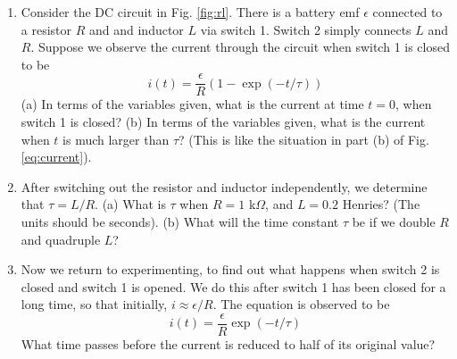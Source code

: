 \documentclass{article}
\begin{document}
\begin{enumerate}
\item Consider the DC circuit in Fig. \ref{fig:rl}.  There is a battery emf $\epsilon$ connected to a resistor $R$ and and inductor $L$ via switch 1.  Switch 2 simply connects $L$ and $R$.  Suppose we observe the current through the circuit when switch 1 is closed to be
\begin{equation}
i(t) = \frac{\epsilon}{R}\left(1 - \exp(-t/\tau) \right) \label{eq:current}
\end{equation}
(a) In terms of the variables given, what is the current at time $t=0$, when switch 1 is closed? (b) In terms of the variables given, what is the current when $t$ is much larger than $\tau$? (This is like the situation in part (b) of Fig. \ref{eq:current}). \\ \vspace{1cm}
\item After switching out the resistor and inductor independently, we determine that $\tau = L/R$.  (a) What is $\tau$ when $R = 1$ k$\Omega$, and $L = 0.2$ Henries?  (The units should be seconds).  (b) What will the time constant $\tau$ be if we double $R$ and quadruple $L$? \\ \vspace{1cm}
\item Now we return to experimenting, to find out what happens when switch 2 is closed and switch 1 is opened. We do this after switch 1 has been closed for a long time, so that initially, $i \approx \epsilon/R$. The equation is observed to be
\begin{equation}
i(t) = \frac{\epsilon}{R}\exp(-t/\tau)
\end{equation}
What time passes before the current is reduced to half of its original value?
\end{enumerate}
\end{document}
